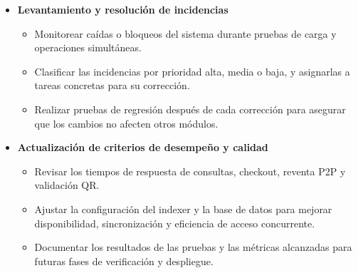 \documentclass[12pt,a4paper]{article}
\begin{document}
\begin{itemize}
    \item \textbf{Levantamiento y resolución de incidencias}
    \begin{itemize}
        \item Monitorear caídas o bloqueos del sistema durante pruebas de carga y
        operaciones simultáneas.
        \item Clasificar las incidencias por prioridad alta, media o baja, y
        asignarlas a tareas concretas para su corrección.
        \item Realizar pruebas de regresión después de cada corrección para
        asegurar que los cambios no afecten otros módulos.
    \end{itemize}

    \item \textbf{Actualización de criterios de desempeño y calidad}
    \begin{itemize}
        \item Revisar los tiempos de respuesta de consultas, checkout, reventa P2P
        y validación QR.
        \item Ajustar la configuración del indexer y la base de datos para mejorar
        disponibilidad, sincronización y eficiencia de acceso concurrente.
        \item Documentar los resultados de las pruebas y las métricas alcanzadas
        para futuras fases de verificación y despliegue.
    \end{itemize}
\end{itemize}
\end{document}
